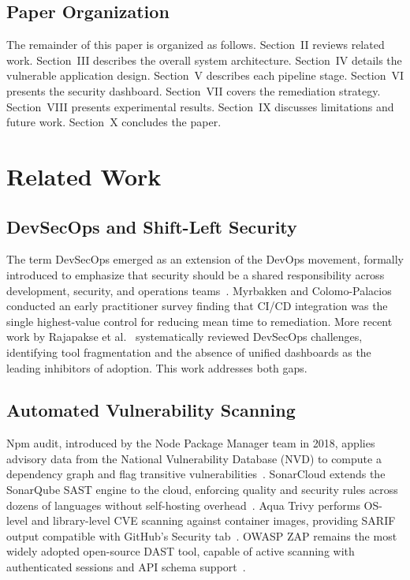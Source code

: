 \documentclass[10pt,conference]{IEEEtran}
\begin{document}
\subsection{Paper Organization}

The remainder of this paper is organized as follows.
Section~II reviews related work.
Section~III describes the overall system architecture.
Section~IV details the vulnerable application design.
Section~V describes each pipeline stage.
Section~VI presents the security dashboard.
Section~VII covers the remediation strategy.
Section~VIII presents experimental results.
Section~IX discusses limitations and future work.
Section~X concludes the paper.

\section{Related Work}

\subsection{DevSecOps and Shift-Left Security}

The term DevSecOps emerged as an extension of the DevOps movement, formally
introduced to emphasize that security should be a shared responsibility across
development, security, and operations teams~\cite{devsecops2019}.
Myrbakken and Colomo-Palacios~\cite{myrbakken2017} conducted an early
practitioner survey finding that CI/CD integration was the single highest-value
control for reducing mean time to remediation.
More recent work by Rajapakse et al.~\cite{rajapakse2022} systematically
reviewed DevSecOps challenges, identifying tool fragmentation and the absence
of unified dashboards as the leading inhibitors of adoption.
This work addresses both gaps.

\subsection{Automated Vulnerability Scanning}

Npm audit, introduced by the Node Package Manager team in 2018, applies
advisory data from the National Vulnerability Database (NVD) to compute
a dependency graph and flag transitive vulnerabilities~\cite{npmaudit}.
SonarCloud extends the SonarQube SAST engine to the cloud, enforcing quality
and security rules across dozens of languages without self-hosting
overhead~\cite{sonarcloud}.
Aqua Trivy performs OS-level and library-level CVE scanning against container
images, providing SARIF output compatible with GitHub's Security
tab~\cite{trivy2021}.
OWASP ZAP remains the most widely adopted open-source DAST tool, capable of
active scanning with authenticated sessions and API schema
support~\cite{zapproxy}.
\end{document}
